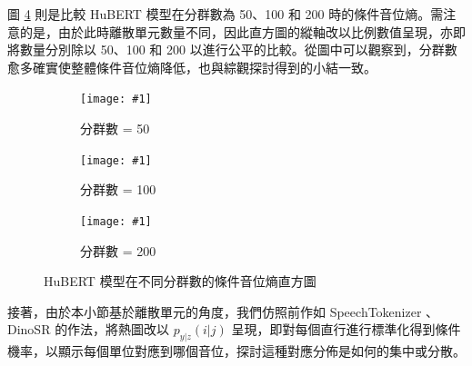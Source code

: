         圖 \ref{fig:hist-cluster} 則是比較 HuBERT 模型在分群數為 50、100 和 200 時的條件音位熵。需注意的是，由於此時離散單元數量不同，因此直方圖的縱軸改以比例數值呈現，亦即將數量分別除以 50、100 和 200 以進行公平的比較。從圖中可以觀察到，分群數愈多確實使整體條件音位熵降低，也與綜觀探討得到的小結一致。

{

\newcommand{\jeffheightt}[1]{\texttt{[image: \#1]}}

\begin{figure}
     \centering
     \begin{subfigure}{\textwidth}  %
         \centering
         \jeffheightt{figures/histo-phngivenunitent-hubert50.png}
         \caption{分群數 = 50}
         \label{fig:ch3-heatmap-cluster--hubert-50-joint-byprob-hist}
     \end{subfigure}
     \vfill

     \begin{subfigure}{\textwidth}  %
         \centering
         \jeffheightt{figures/histo-phngivenunitent-hubert100-prob.png}
         \caption{分群數 = 100}
         \label{fig:ch3-heatmap-cluster--hubert-100-joint-byprob-hist}
     \end{subfigure}

    \vfill

     \begin{subfigure}{\textwidth}  %
         \centering
         \jeffheightt{figures/histo-phngivenunitent-hubert200-prob.png}
         \caption{分群數 = 200}
         \label{fig:ch3-heatmap-cluster--hubert-200-joint-byprob-hist}
     \end{subfigure}

     \caption{HuBERT 模型在不同分群數的條件音位熵直方圖}
     \label{fig:hist-cluster}
\end{figure}

}

        接著，由於本小節基於離散單元的角度，我們仿照前作如 SpeechTokenizer \cite{zhang2024speechtokenizer}、DinoSR \cite{liu2024dinosr} 的作法，將熱圖改以 $p_{y|z}(i|j)$ 呈現，即對每個直行進行標準化得到條件機率，以顯示每個單位對應到哪個音位，探討這種對應分佈是如何的集中或分散。

